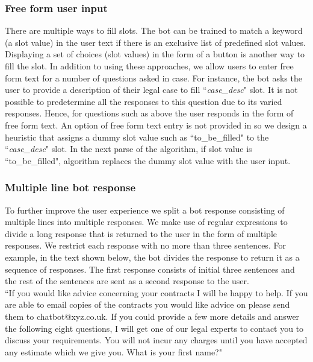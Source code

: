 \documentclass[runningheads]{llncs}
\begin{document}
\subsubsection{Free form user input}
There are multiple ways to fill slots. The bot can be trained to match a keyword (a slot value) in the user text if there is an exclusive list of predefined slot values. Displaying a set of choices (slot values) in the form of a button is another way to fill the slot.
In addition to using these approaches, we allow users to enter free form text for a number of questions asked in \ff case. For instance, the bot asks the user to provide a description of their legal case to fill ``\textit{case\_desc}" slot. It is not possible to predetermine all the responses to this question due to its varied responses. Hence, for questions such as above the user responds in the form of free form text. An option of free form text entry is not provided in \lex so we design a heuristic that assigns a dummy slot value such as ``to\_be\_filled" to the ``\textit{case\_desc}" slot. In the next parse of the algorithm, if slot value is ``to\_be\_filled", algorithm replaces the dummy slot value with the user input.

\subsubsection{Multiple line bot response}
To further improve the user experience we split a bot response consisting of multiple lines into multiple responses. We make use of regular expressions to divide a long response that is returned to the user in the form of multiple responses. We restrict each response with no more than three sentences. For example, in the text shown below, the bot divides the response to return it as a sequence of responses. The first response consists of initial three sentences and the rest of the sentences are sent as a second response to the user. \\

``If you would like advice concerning your contracts I will be happy to help. If you are able to email copies of the contracts you would like advice on please send them to chatbot@xyz.co.uk. If you could provide a few more details and answer the following eight questions, I will get one of our legal experts to contact you to discuss your requirements. You will not incur any charges until you have accepted any estimate which we give you. What is your first name?"\\
\end{document}

